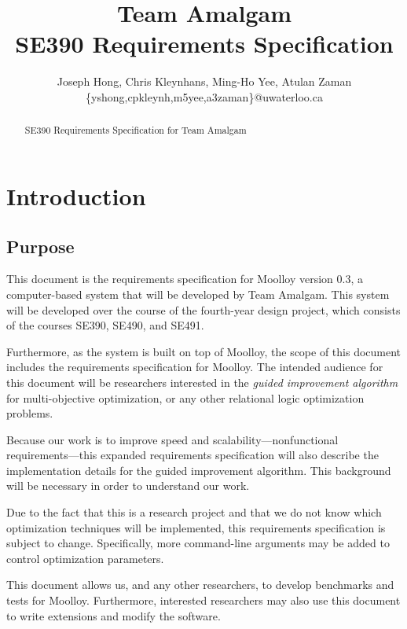 \documentclass[11pt]{article}
\title{{\Large Team Amalgam} \\ SE390 Requirements Specification}
\author{Joseph Hong, Chris Kleynhans, Ming-Ho Yee, Atulan Zaman \\
        \{yshong,cpkleynh,m5yee,a3zaman\}@uwaterloo.ca}
\theoremstyle{definition}
\begin{document}
\maketitle

\begin{abstract}
SE390 Requirements Specification for Team Amalgam
\end{abstract}

\tableofcontents
\newpage

\section{Introduction}\label{sec:intro}
\subsection{Purpose}\label{sec:purpose}

This document is the requirements specification for Moolloy version
0.3, a computer-based system that will be developed by Team Amalgam.
This system will be developed over the course of the fourth-year design
project, which consists of the courses SE390, SE490, and SE491.

Furthermore, as the system is built on top of Moolloy, the scope of
this document includes the requirements specification for Moolloy.
The intended audience for this document will be researchers interested
in the \textit{guided improvement algorithm} for multi-objective
optimization, or any other relational logic optimization problems.

Because our work is to improve speed and
scalability---nonfunctional requirements---this expanded requirements
specification will also describe the implementation details for the
guided improvement algorithm. This background will be necessary in
order to understand our work.

Due to the fact that this is a research project and that we do not know
which optimization techniques will be implemented, this requirements
specification is subject to change. Specifically, more command-line
arguments may be added to control optimization parameters.

This document allows us, and any other researchers, to develop
benchmarks and tests for Moolloy. Furthermore, interested researchers
may also use this document to write extensions and modify the software.
\end{document}
